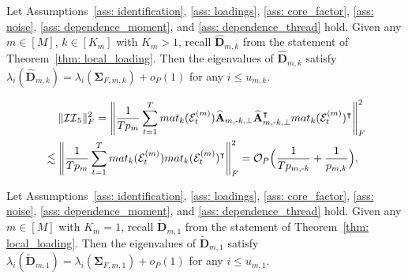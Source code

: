 \documentclass[10pt,a4paper]{amsart}
\def\bA{\mathbf{A}}
\def\bD{\mathbf{D}}
\def\bSigma{\boldsymbol{\Sigma}} \def\bOmega{\boldsymbol{\Omega}}
\def\cE{\mathcal{E}}
\def\cII{\mathcal{II}}
\def\cO{\mathcal{O}}
\def\mat{\textnormal{\textsc{mat}}}
\def\trans{\intercal}
\def\wh#1{\widehat{#1}}
\def\wt#1{\widetilde{#1}}
\begin{document}
\begin{lemma}\label{lemma: eigenvalue_Sigma_B}
Let Assumptions~\ref{ass: identification}, \ref{ass: loadings}, \ref{ass: core_factor}, \ref{ass: noise}, \ref{ass: dependence_moment}, and \ref{ass: dependence_thread} hold.
Given any $m\in[M]$, $k\in[K_m]$ with $K_m> 1$, recall $\wh{\bD}_{m,k}$ from the statement of Theorem~\ref{thm: local_loading}.
Then the eigenvalues of $\wh{\bD}_{m,k}$ satisfy $\lambda_i(\wh{\bD}_{m,k}) = \lambda_i(\bSigma_{F,m,k}) + o_P(1)$ for any $i\leq u_{m,k}$.
\end{lemma}

\begin{align}
    &\;\quad
    \|\cII_5\|_F^2 = \Bigg\| \frac{1}{Tp_m} \sum_{t=1}^T \mat_k(\cE_t^{(m)}) \wh{\bA}_{m,\text{-}k,\perp} \wh{\bA}_{m,\text{-}k,\perp}^\trans \mat_k(\cE_t^{(m)})^\trans \Bigg\|_F^2 \notag \\
    &\lesssim
    \Bigg\| \frac{1}{Tp_m} \sum_{t=1}^T \mat_k(\cE_t^{(m)}) \mat_k(\cE_t^{(m)})^\trans \Bigg\|_F^2
    = \cO_P\Big( \frac{1}{T p_{m,\text{-}k}} + \frac{1}{p_{m,k}} \Big) ,
    \label{eqn: cII_5}
\end{align}

\begin{lemma}\label{lemma: eigenvalue_tilde_Sigma_B}
Let Assumptions~\ref{ass: identification}, \ref{ass: loadings}, \ref{ass: core_factor}, \ref{ass: noise}, \ref{ass: dependence_moment}, and \ref{ass: dependence_thread} hold.
Given any $m\in[M]$ with $K_m= 1$, recall $\wt{\bD}_{m,1}$ from the statement of Theorem~\ref{thm: local_loading}.
Then the eigenvalues of $\wt{\bD}_{m,1}$ satisfy $\lambda_i(\wt{\bD}_{m,1}) = \lambda_i(\bSigma_{F,m,1}) + o_P(1)$ for any $i\leq u_{m,1}$.
\end{lemma}
\end{document}
